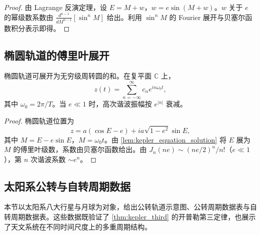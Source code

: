 \begin{proof}
由 Lagrange 反演定理，设 \(E=M+w\)，\(w=e\sin(M+w)\)。\(w\) 关于 \(e\) 的幂级数系数由 \(\frac{d^{n-1}}{dM^{n-1}}[\sin^n M]\) 给出。利用 \(\sin^n M\) 的 Fourier 展开与贝塞尔函数积分表示即得。
\end{proof}

\subsection{椭圆轨道的傅里叶展开}

\begin{proposition}\label{prop:elliptic_epicycle_expansion}
椭圆轨道可展开为无穷级周转圆的和。在复平面 \(\mathbb C\) 上，
\[
z(t)=\sum_{n=-\infty}^{\infty}c_n e^{in\omega_0 t},
\]
其中 \(\omega_0=2\pi/T\)。当 \(e\ll1\) 时，高次谐波振幅按 \(e^{|n|}\) 衰减。
\end{proposition}

\begin{proof}
椭圆轨道位置为
\[
z=a(\cos E-e)+ia\sqrt{1-e^2}\sin E,
\]
其中 \(M=E-e\sin E\)，\(M=\omega_0t\)。由 \cref{lem:kepler_equation_solution} 将 \(E\) 展为 \(M\) 的傅里叶级数，系数由贝塞尔函数给出。由 \(J_n(ne)\sim(ne/2)^n/n!\)（\(e\ll1\)），第 \(n\) 次谐波系数 \(\sim e^n\)。
\end{proof}

\subsection{太阳系公转与自转周期数据}
\label{subsec:solar_system_periods}

本节以太阳系八大行星与月球为对象，给出公转轨道示意图、公转周期数据表与自转周期数据表。这些数据既验证了 \cref{thm:kepler_third} 的开普勒第三定律，也展示了天文系统在不同时间尺度上的多重周期结构。

